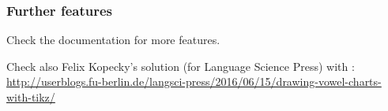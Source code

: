 \begin{frame}[fragile]
\frametitle{Further features}

Check the documentation \citep{Rei01a} for more features.

\bigskip


Check also Felix Kopecky's solution (for Language Science Press) with :\\
\url{http://userblogs.fu-berlin.de/langsci-press/2016/06/15/drawing-vowel-charts-with-tikz/}

\end{frame}


%
%
%
%


%
%
%


%
%	
%
%
%

